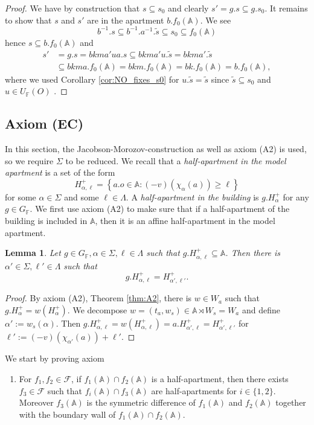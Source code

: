 \documentclass[12pt]{amsart}
\newcommand{\F}{\mathbb{F} }
\newcommand{\A}{\mathbb{A}}
\newcommand{\Fun}{\mathscr{F}} %
\numberwithin{equation}{section}
\newtheorem{lemma}[theorem]{Lemma}
\theoremstyle{remark} %
\begin{document}
\begin{proof}
			We have by construction that $s\subseteq s_0$ and clearly $s'=g.s \subseteq g.s_0$. It remains to show that $s$ and $s'$ are in the apartment $b.f_0(\A)$. We see
			$$
			b^{-1}.s \subseteq b^{-1}.a^{-1}.\tilde{s} \subseteq s_0 \subseteq f_0(\A)
			$$
			hence $s \subseteq b.f_0(\A)$ and
			\begin{align*}
				s' &= g.s = bkma'ua.s \subseteq bkma'u.\tilde{s} = bkma'.\tilde{s} \\
				&\subseteq bkma.f_0(\A) = bkm.f_0(\A) = bk.f_0(\A) = b.f_0(\A),
			\end{align*}
			where we used Corollary \ref{cor:NO_fixes_s0} for $u.\tilde{s} = \tilde{s}$ since $\tilde{s} \subseteq s_0$ and $u\in U_\F(O)$ . 
		\end{proof}
		
		
		
\subsection{Axiom (EC)}\label{sec:EC}
		In this section, the Jacobson-Morozov-construction as well as axiom (A2) is used, so we require $\Sigma$ to be reduced. We recall that a \emph{half-apartment in the model apartment} is a set of the form
		$$
		H_{\alpha,\ell}^+ = \left\{ a.o \in \A \colon (-v)(\chi_\alpha(a)) \geq \ell \right\}
		$$
		for some $\alpha \in \Sigma$ and some $\ell \in \Lambda$. A \emph{half-apartment in the building} is $g.H_\alpha^+$ for any $g \in G_\F$. We first use axiom (A2) to make sure that if a half-apartment of the building is included in $\A$, then it is an affine half-apartment in the model apartment.
		\begin{lemma}\label{lem:subhalfapartment_nice}
			Let $g\in G_\F, \alpha \in \Sigma, \ell \in \Lambda$ such that $g.H_{\alpha,\ell}^+ \subseteq \A$. Then there is $\alpha' \in \Sigma, \ell' \in \Lambda$ such that 
			$$
			g.H_{\alpha,\ell}^+ = H_{\alpha', \ell'}^+ .
			$$
		\end{lemma}
		\begin{proof}
			By axiom (A2), Theorem \ref{thm:A2}, there is $w \in W_a$ such that $g.H_\alpha^+ = w(H_\alpha^+)$. We decompose $w = (t_a, w_s) \in \A \rtimes W_s = W_a$ and define $\alpha' := w_s(\alpha)$. Then $g.H_{\alpha,\ell}^+ = w(H_{\alpha,\ell}^+) = a.H_{\alpha',\ell}^+ = H_{\alpha', \ell'}^+$ for $\ell' := (-v)(\chi_{\alpha'}(a)) + \ell'$. 
		\end{proof}
		We start by proving axiom
		\begin{enumerate}
			\item [(EC)] For $f_1,f_2 \in \Fun$, if $f_1(\A)\cap f_2(\A)$ is a half-apartment, then there exists $f_3 \in \Fun$ such that $f_i(\A)\cap f_3(\A)$ are half-apartments for $i\in \{1,2\}$. Moreover $f_3(\A)$ is the symmetric difference of $f_1(\A)$ and $f_2(\A)$ together with the boundary wall of $f_1(\A) \cap f_2(\A)$.
		\end{enumerate}
\end{document}
